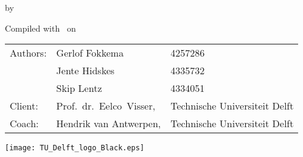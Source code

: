 \makecover[whitelogo]

\begin{titlepage}
  \begin{center}
    {\makeatletter
    \largetitlestyle\fontsize{64}{94}\selectfont\@title
    \makeatother}

    {\makeatletter
    \ifx\@subtitle\undefined\else
        \bigskip
       {\tudsffamily\fontsize{22}{32}\selectfont\@subtitle}
    \fi
    \makeatother}

    \bigskip
    \bigskip

    by

    \bigskip
    \bigskip

    {\makeatletter
    \largetitlestyle\fontsize{26}{26}\selectfont\@author
    \makeatother}

    \bigskip
    \bigskip
    \vfill

    {\makeatletter\large
    Compiled with \XeLaTeX\ on \@date\par
    \makeatother}

    \bigskip
    \bigskip
    \vfill

    \begin{tabular}{lll}
      Authors:             & Gerlof Fokkema             & 4257286 \\
                           & Jente Hidskes              & 4335732 \\
                           & Skip Lentz                 & 4334051 \\
      Client:              & Prof.~dr.~Eelco~Visser,    & Technische Universiteit Delft \\
      Coach:               & Hendrik van Antwerpen,     & Technische Universiteit Delft
    \end{tabular}

    \vfill
    \texttt{[image: TU\_Delft\_logo\_Black.eps]}
  \end{center}
\end{titlepage}
